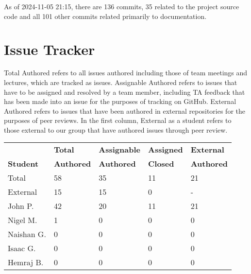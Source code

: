 \documentclass{article}
\begin{document}

As of 2024-11-05 21:15, there are 136 commits, 35 related to the project source code and all 101 other commits related primarily to documentation.

\section{Issue Tracker}


Total Authored refers to all issues authored including those of team meetings and lectures, which are tracked as issues. Assignable Authored refers to issues that have to be assigned and resolved by a team member, including TA feedback that has been made into an issue for the purposes of tracking on GitHub. External Authored refers to issues that have been authored in external repositories for the purposes of peer reviews. In the first column, External as a student refers to those external to our group that have authored issues through peer review.

\begin{table}[H]
\centering
\begin{tabular}{lllll}
\toprule
\textbf{ } & \textbf{Total} & \textbf{Assignable} & \textbf{Assigned} & \textbf{External}\\
\textbf{Student} & \textbf{Authored} & \textbf{Authored} & \textbf{Closed} & \textbf{Authored}\\
\midrule
Total & 58 & 35 & 11 & 21 \\
\midrule
External & 15 & 15 & 0 & - \\
John P. & 42 & 20 & 11 & 21 \\
Nigel M. & 1 & 0 & 0 & 0 \\
Naishan G. & 0 & 0 & 0 & 0 \\
Isaac G. & 0 & 0 & 0 & 0 \\
Hemraj B. & 0 & 0 & 0 & 0 \\
\bottomrule
\end{tabular}
\end{table}
\end{document}
